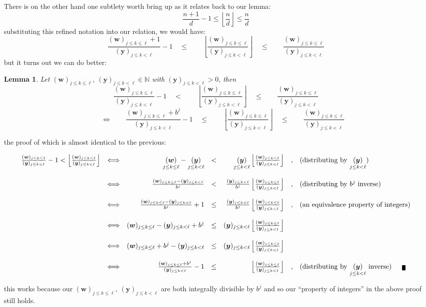 \documentclass[twoside]{article}
\renewcommand{\leq}{\ensuremath{\quad\le\qquad}}
\newcommand{\bradix}[2][u]{\ensuremath{\underset{#2}{(\bm{#1})}}}
\newcommand{\numer}[3][w]{\ensuremath{(\bm{#1})_{#2\le k\le #3}}}
\newcommand{\denom}[3][y]{\ensuremath{(\bm{#1})_{#2\le k <  #3}}}
\newtheorem{lemma}{Lemma}[section]
\newenvironment{proof}[1][Proof]{\begin{trivlist}
\item[\hskip \labelsep {\bfseries #1}]}{\end{trivlist}}
\newcommand{\qed}{\nobreak \ifvmode \relax \else
      \ifdim\lastskip<1.5em \hskip-\lastskip
      \hskip1.5em plus0em minus0.5em \fi \nobreak
      \vrule height0.5em width0.5em depth0.25em\fi}
\begin{document}
There is on the other hand one subtlety worth bring up as it relates back to our lemma:
$$ \frac{n+1}{d}-1 \le\left\lfloor\frac{n}{d}\right\rfloor\le\frac{n}{d} $$
substituting this refined notation into our relation, we would have:
$$ \frac{\numer{j}{\ell}+1}{\denom{j}{\ell}}-1
	\leq\left\lfloor\frac{\numer{j}{\ell}}{\denom{j}{\ell}}\right\rfloor
	\leq\frac{\numer{j}{\ell}}{\denom{j}{\ell}} $$
but it turns out we can do better:
\begin{lemma}
Let $ \numer{j}{\ell},\ \denom{j}{\ell}\in\mathbb{N} $ with $ \denom{j}{\ell} > 0 $, then
$$ \frac{\numer{j}{\ell}}{\denom{j}{\ell}}-1
	\quad <\qquad\left\lfloor\frac{\numer{j}{\ell}}{\denom{j}{\ell}}\right\rfloor
	\leq\frac{\numer{j}{\ell}}{\denom{j}{\ell}} $$
$$ \qquad\Longleftrightarrow\qquad\frac{\numer{j}{\ell}+b^j}{\denom{j}{\ell}}-1
	\leq\left\lfloor\frac{\numer{j}{\ell}}{\denom{j}{\ell}}\right\rfloor
	\leq\frac{\numer{j}{\ell}}{\denom{j}{\ell}} $$
\end{lemma}
the proof of which is almost identical to the previous:

\begin{proof}

$$ \begin{array}{rcrcrll}
\frac{\numer{j}{\ell}}{\denom{j}{\ell}}-1 < \left\lfloor\frac{\numer{j}{\ell}}{\denom{j}{\ell}}\right\rfloor
	& \Longleftrightarrow	& \bradix[w]{j\le k\le\ell}-\bradix[y]{j\le k < \ell}
	& < & \bradix[y]{j\le k < \ell}\left\lfloor\frac{\numer{j}{\ell}}{\denom{j}{\ell}}\right\rfloor
	& , & \mbox{(distributing by $ \bradix[y]{j\le k < \ell} $)} \\
\\
	& \Longleftrightarrow	& \frac{\numer{j}{\ell}-\denom{j}{\ell}}{b^j}
	& < & \frac{\denom{j}{\ell}}{b^j}\left\lfloor\frac{\numer{j}{\ell}}{\denom{j}{\ell}}\right\rfloor
	& , & \mbox{(distributing by $ b^j $ inverse)} \\
\\
	& \Longleftrightarrow	& \frac{\numer{j}{\ell}-\denom{j}{\ell}}{b^j}+1
	& \le	& \frac{\denom{j}{\ell}}{b^j}\left\lfloor\frac{\numer{j}{\ell}}{\denom{j}{\ell}}\right\rfloor
	& , & \mbox{(an equivalence property of integers)} \\
\\
	& \Longleftrightarrow	& \numer{j}{\ell}-\denom{j}{\ell}+b^j
	& \le	& \denom{j}{\ell}\left\lfloor\frac{\numer{j}{\ell}}{\denom{j}{\ell}}\right\rfloor
	&   & 		\\
\\
	& \Longleftrightarrow	& \numer{j}{\ell}+b^j-\denom{j}{\ell}
	& \le	& \denom{j}{\ell}\left\lfloor\frac{\numer{j}{\ell}}{\denom{j}{\ell}}\right\rfloor
	&   & 		\\
\\
	& \Longleftrightarrow	& \frac{\numer{j}{\ell}+b^j}{\denom{j}{\ell}}-1
	& \le & \left\lfloor\frac{\numer{j}{\ell}}{\denom{j}{\ell}}\right\rfloor
	& , & \mbox{(distributing by $ \bradix[y]{j\le k < \ell} $ inverse)}\qed
\end{array} $$
\end{proof}
this works because our $ \numer{j}{\ell},\ \denom{j}{\ell} $ are both integrally divisible
by $ b^j $ and so our ``property of integers'' in the above proof still holds.
\end{document}
